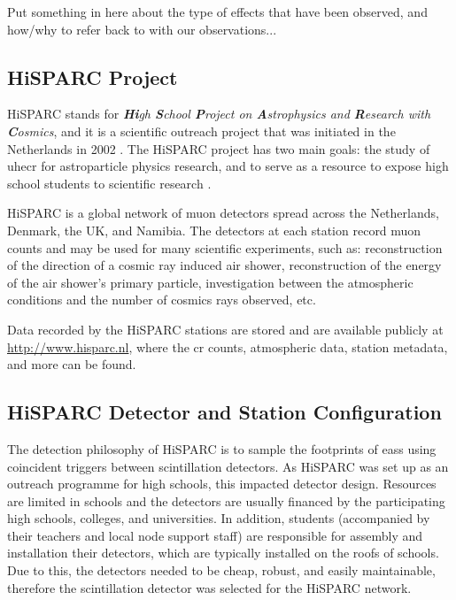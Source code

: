 Put something in here about the type of effects that have been observed, and how/why to refer back to with our observations...


\subsection{HiSPARC Project}

HiSPARC stands for \textit{\textbf{Hi}gh \textbf{S}chool \textbf{P}roject on \textbf{A}strophysics and \textbf{R}esearch with \textbf{C}osmics}, and it is a scientific outreach project that was initiated in the Netherlands in 2002 \citep{bartels_hisparc_2012}. The HiSPARC project has two main goals: the study of \gls{uhecr} for astroparticle physics research, and to serve as a resource to expose high school students to scientific research \citep{bartels_hisparc_2012}.

HiSPARC is a global network of muon detectors spread across the Netherlands, Denmark, the UK, and Namibia. The detectors at each station record muon counts and may be used for many scientific experiments, such as: reconstruction of the direction of a cosmic ray induced air shower, reconstruction of the energy of the air shower's primary particle, investigation between the atmospheric conditions and the number of cosmics rays observed, etc.

Data recorded by the HiSPARC stations are stored and are available publicly at \url{http://www.hisparc.nl}, where the \gls{cr} counts, atmospheric data, station metadata, and more can be found.

\subsection{HiSPARC Detector and Station Configuration}

The detection philosophy of HiSPARC is to sample the footprints of \glspl{eas} using coincident triggers between scintillation detectors. As HiSPARC was set up as an outreach programme for high schools, this impacted detector design. Resources are limited in schools and the detectors are usually financed by the participating high schools, colleges, and universities. In addition, students (accompanied by their teachers and local node support staff) are responsible for assembly and installation their detectors, which are typically installed on the roofs of schools. Due to this, the detectors needed to be cheap, robust, and easily maintainable, therefore the scintillation detector was selected for the HiSPARC network.

